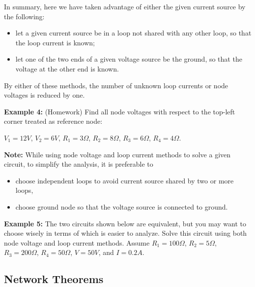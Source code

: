 In summary, here we have taken advantage of either the given current 
source by the following:
\begin{itemize}
\item let a given current source be in a loop not shared with any 
  other loop, so that the loop current is known;
\item let one of the two ends of a given voltage source be the 
  ground, so that the voltage at the other end is known.
\end{itemize}
By either of these methods, the number of unknown loop currents or 
node voltages is reduced by one.

{\bf Example 4:} (Homework) Find all node voltages with respect to the 
top-left corner treated as reference node:


$V_1=12 V$, $V_2=6 V$, $R_1=3 \Omega$, $R_2=8 \Omega$, $R_3=6 \Omega$, 
$R_4=4\Omega$.


{\bf Note:} While using node voltage and loop current methods to solve 
a given circuit, to simplify the analysis, it is preferable to
\begin{itemize}
  \item choose independent loops to avoid current source shared by two 
    or more loops,
  \item choose ground node so that the voltage source is connected to 
    ground.
\end{itemize}

{\bf Example 5:} The two circuits shown below are equivalent, but you 
may want to choose wisely in terms of which is easier to analyze. Solve 
this circuit using both node voltage and loop current methods. Assume 
$R_1=100\Omega$, $R_2=5\Omega$, $R_3=200\Omega$, $R_4=50\Omega$, $V=50V$,
and $I=0.2A$.

  


\subsection*{Network Theorems}

